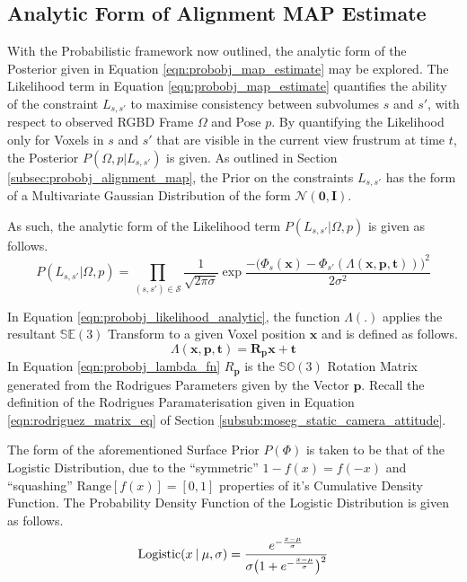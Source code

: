 \subsection{Analytic Form of Alignment MAP Estimate}
\label{subsec:probobj_analytic_alignment_map}
With the Probabilistic framework now outlined, the analytic form of the
Posterior given in Equation \ref{eqn:probobj_map_estimate} may be explored. The
Likelihood term in Equation \ref{eqn:probobj_map_estimate} quantifies the
ability of the constraint $L_{s, s'}$ to maximise consistency between subvolumes
$s$ and $s'$, with respect to observed RGBD Frame $\Omega$ and Pose $p$. By
quantifying the Likelihood only for Voxels in $s$ and $s'$ that are visible in
the current view frustrum at time $t$, the Posterior $P(\Omega, p | L_{s, s'})$
is given. As outlined in Section \ref{subsec:probobj_alignment_map}, the Prior
on the constraints $L_{s, s'}$ has the form of a Multivariate Gaussian
Distribution of the form $\mathcal{N}(\mathbf{0}, \mathbf{I})$.

As such, the analytic form of the Likelihood term $P(L_{s, s'} | \Omega, p)$ is
given as follows.
\begin{equation}
  \label{eqn:probobj_likelihood_analytic}
  P(L_{s, s'} | \Omega, p) = \prod_{(s, s') \in \mathcal{S}}
  \frac{1}{\sqrt{2 \pi \sigma}}
  \exp{\frac{-\big(\Phi_{s}(\mathbf{x}) -
  \Phi_{s'}(\Lambda(\mathbf{x}, \mathbf{p}, \mathbf{t}))\big)^{2}}
  {2\sigma^{2}}}
\end{equation}

In Equation \ref{eqn:probobj_likelihood_analytic}, the function $\Lambda(.)$
applies the resultant $\mathbb{SE}(3)$ Transform to a given Voxel position
$\mathbf{x}$ and is defined as follows.
\begin{equation}
  \label{eqn:probobj_lambda_fn}
  \Lambda(\mathbf{x}, \mathbf{p}, \mathbf{t}) =
  \mathbf{R}_{\mathbf{p}} \mathbf{x} + \mathbf{t}
\end{equation}
In Equation \ref{eqn:probobj_lambda_fn} $R_{\mathbf{p}}$ is the $\mathbb{SO}(3)$
Rotation Matrix generated from the Rodrigues Parameters given by the Vector
$\mathbf{p}$. Recall the definition of the Rodrigues Paramaterisation given in
Equation \ref{eqn:rodriguez_matrix_eq} of Section
\ref{subsub:moseg_static_camera_attitude}.

The form of the aforementioned Surface Prior $P(\Phi)$ is taken to be that of
the Logistic Distribution, due to the ``symmetric'' $1 - f(x) = f(-x)$
and ``squashing'' $\text{Range}[f(x)] = [0, 1]$ properties of it's Cumulative
Density Function. The Probability Density Function of the Logistic Distribution
is given as follows.
\begin{equation}
  \label{eqn:probobj_logistic_dist}
  \text{Logistic}(x \:\vert\: \mu, \sigma) = \frac
  {e^{-\frac{x - \mu}{\sigma}}}
  {\sigma \big( 1 + e^{-\frac{x - \mu}{\sigma}} \big)^{2}}
\end{equation}

